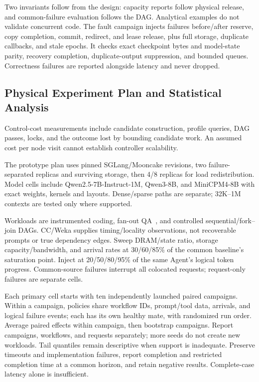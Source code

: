\documentclass[sigplan,10pt,anonymous,nonacm]{acmart}
\begin{document}
Two invariants follow from the design: capacity reports follow physical
release, and common-failure evaluation follows the DAG. Analytical
examples do not validate concurrent code. The fault
campaign injects failures before/after reserve, copy completion, commit,
redirect, and lease release, plus full storage, duplicate callbacks, and
stale epochs. It checks exact checkpoint bytes and model-state parity,
recovery completion, duplicate-output suppression, and bounded queues.
Correctness failures are reported alongside latency and never dropped.

\subsection{Physical Experiment Plan and Statistical Analysis}
\label{sec:eval-plan}



Control-cost measurements include candidate construction, profile queries,
DAG passes, locks, and the outcome lost by bounding candidate work. An
assumed cost per node visit cannot establish controller scalability.

The prototype plan uses pinned SGLang/Mooncake revisions, two
failure-separated replicas and surviving storage, then 4/8 replicas for
load redistribution. Model cells include Qwen2.5-7B-Instruct-1M, Qwen3-8B,
and MiniCPM4-8B with exact weights, kernels and layouts. Dense/sparse paths
are separate; 32K--1M contexts are tested only where supported.

Workloads are instrumented coding, fan-out QA~\cite{zhu2024fanoutqa}, and
controlled sequential/fork--join DAGs. CC/Weka supplies timing/locality
observations, not recoverable prompts or true dependency edges. Sweep
DRAM/state ratio, storage capacity/bandwidth, and arrival rates at
30/60/85\% of the common baseline's saturation point. Inject at
20/50/80/95\% of the same Agent's logical token progress. Common-source
failures interrupt all colocated requests; request-only failures are
separate cells.

Each primary cell starts with ten independently launched paired campaigns.
Within a campaign, policies share workflow IDs, prompt/tool data, arrivals,
and logical failure events; each has its own healthy mate, with randomized
run order. Average paired effects within campaign, then bootstrap campaigns.
Report campaigns, workflows, and requests separately; more seeds do not
create new workloads. Tail quantiles remain descriptive when support is
inadequate. Preserve timeouts and implementation failures, report completion
and restricted completion time at a common horizon, and retain negative
results. Complete-case latency alone is insufficient.
\end{document}
